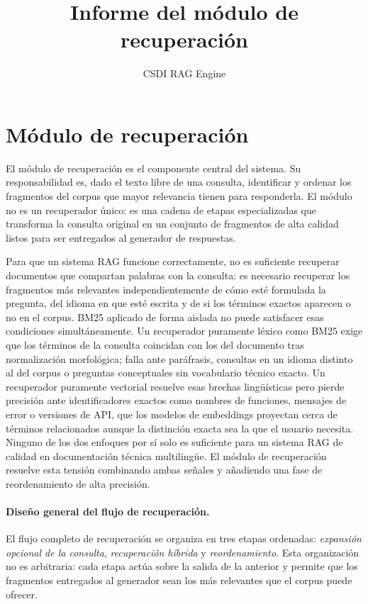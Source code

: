 \documentclass[11pt]{article}
\title{Informe del módulo de recuperación}
\author{CSDI RAG Engine}
\date{}
\begin{document}
\maketitle

\section{Módulo de recuperación}

El módulo de recuperación es el componente central del sistema. Su responsabilidad es, dado el
texto libre de una consulta, identificar y ordenar los fragmentos del corpus que mayor relevancia
tienen para responderla. El módulo no es un recuperador único: es una cadena de etapas
especializadas que transforma la consulta original en un conjunto de fragmentos de alta calidad
listos para ser entregados al generador de respuestas.

Para que un sistema RAG funcione correctamente, no es suficiente recuperar documentos que
compartan palabras con la consulta: es necesario recuperar los fragmentos más relevantes
independientemente de cómo esté formulada la pregunta, del idioma en que esté escrita y de si
los términos exactos aparecen o no en el corpus. BM25 aplicado de forma aislada no puede
satisfacer esas condiciones simultáneamente. Un recuperador puramente léxico como BM25 exige
que los términos de la consulta coincidan con los del documento tras normalización morfológica;
falla ante paráfrasis, consultas en un idioma distinto al del corpus o preguntas conceptuales
sin vocabulario técnico exacto. Un recuperador puramente vectorial resuelve esas brechas
lingüísticas pero pierde precisión ante identificadores exactos como nombres de funciones,
mensajes de error o versiones de API, que los modelos de embeddings proyectan cerca de términos
relacionados aunque la distinción exacta sea la que el usuario necesita. Ninguno de los dos
enfoques por sí solo es suficiente para un sistema RAG de calidad en documentación técnica
multilingüe. El módulo de recuperación resuelve esta tensión combinando ambas señales y
añadiendo una fase de reordenamiento de alta precisión.

\paragraph{Diseño general del flujo de recuperación.}
El flujo completo de recuperación se organiza en tres etapas ordenadas: \emph{expansión opcional
de la consulta}, \emph{recuperación híbrida} y \emph{reordenamiento}. Esta organización no es
arbitraria: cada etapa actúa sobre la salida de la anterior y permite que los fragmentos
entregados al generador sean los más relevantes que el corpus puede ofrecer.
\end{document}
